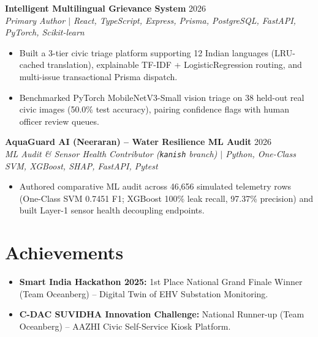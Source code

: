 \documentclass[10pt,a4paper]{article}
\begin{document}
\textbf{Intelligent Multilingual Grievance System} \hfill 2026\\
\textit{Primary Author $|$ React, TypeScript, Express, Prisma, PostgreSQL, FastAPI, PyTorch, Scikit-learn}
\begin{itemize}
  \item Built a 3-tier civic triage platform supporting 12 Indian languages (LRU-cached translation), explainable TF-IDF + LogisticRegression routing, and multi-issue transactional Prisma dispatch.
  \item Benchmarked PyTorch MobileNetV3-Small vision triage on 38 held-out real civic images (50.0\% test accuracy), pairing confidence flags with human officer review queues.
\end{itemize}

\textbf{AquaGuard AI (Neeraran) -- Water Resilience ML Audit} \hfill 2026\\
\textit{ML Audit \& Sensor Health Contributor (\texttt{kanish} branch) $|$ Python, One-Class SVM, XGBoost, SHAP, FastAPI, Pytest}
\begin{itemize}
  \item Authored comparative ML audit across 46,656 simulated telemetry rows (One-Class SVM 0.7451 F1; XGBoost 100\% leak recall, 97.37\% precision) and built Layer-1 sensor health decoupling endpoints.
\end{itemize}

\section*{Achievements}
\begin{itemize}
  \item \textbf{Smart India Hackathon 2025:} 1st Place National Grand Finale Winner (Team Oceanberg) -- Digital Twin of EHV Substation Monitoring.
  \item \textbf{C-DAC SUVIDHA Innovation Challenge:} National Runner-up (Team Oceanberg) -- AAZHI Civic Self-Service Kiosk Platform.
\end{itemize}
\end{document}
